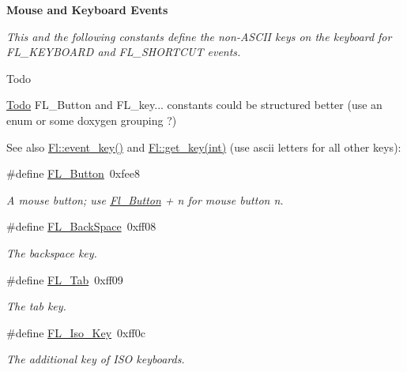 \begin{Indent}\textbf{ Mouse and Keyboard Events}\par
{\em This and the following constants define the non-\/\+A\+S\+C\+II keys on the keyboard for F\+L\+\_\+\+K\+E\+Y\+B\+O\+A\+RD and F\+L\+\_\+\+S\+H\+O\+R\+T\+C\+UT events.

\begin{DoxyRefDesc}{Todo}
\item[\hyperlink{todo__todo000002}{Todo}]F\+L\+\_\+\+Button and F\+L\+\_\+key... constants could be structured better (use an enum or some doxygen grouping ?)\end{DoxyRefDesc}


\begin{DoxySeeAlso}{See also}
\hyperlink{group__fl__events_ga1ac131e3cd5ca674cc022b1f77233449}{Fl\+::event\+\_\+key()} and \hyperlink{group__fl__events_gae7cc46c942d3b62b6b55422d185b6b8d}{Fl\+::get\+\_\+key(int)} (use ascii letters for all other keys)\+: 
\end{DoxySeeAlso}
}\begin{DoxyCompactItemize}
\item 
\#define \hyperlink{_enumerations_8_h_a1df1e46a5113628156ed7b7f995217d0}{F\+L\+\_\+\+Button}~0xfee8
\begin{DoxyCompactList}\small\item\em A mouse button; use \hyperlink{class_fl___button}{Fl\+\_\+\+Button} + n for mouse button n. \end{DoxyCompactList}\item 
\#define \hyperlink{_enumerations_8_h_a20dc86e7758a88b4d1f06323e2de9896}{F\+L\+\_\+\+Back\+Space}~0xff08
\begin{DoxyCompactList}\small\item\em The backspace key. \end{DoxyCompactList}\item 
\#define \hyperlink{_enumerations_8_h_aa6e3e7f377cecb30c77f112ce54c3753}{F\+L\+\_\+\+Tab}~0xff09
\begin{DoxyCompactList}\small\item\em The tab key. \end{DoxyCompactList}\item 
\#define \hyperlink{_enumerations_8_h_ae56945dcc3ab2a95c59b32ab54bcaabd}{F\+L\+\_\+\+Iso\+\_\+\+Key}~0xff0c
\begin{DoxyCompactList}\small\item\em The additional key of I\+SO keyboards. \end{DoxyCompactList}\item 

\end{DoxyCompactItemize}
\end{Indent}
